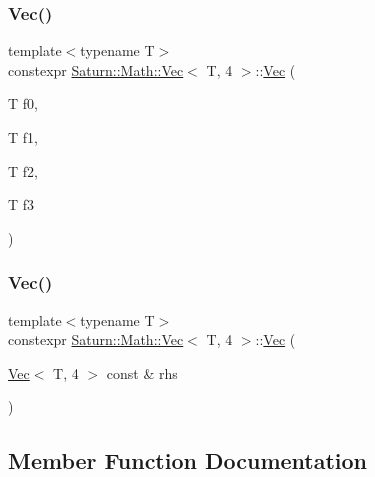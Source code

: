 \subsubsection{\texorpdfstring{Vec()}{Vec()}\hspace{0.1cm}{\footnotesize\ttfamily [3/4]}}
{\footnotesize\ttfamily template$<$typename T$>$ \\
constexpr \mbox{\hyperlink{class_saturn_1_1_math_1_1_vec}{Saturn\+::\+Math\+::\+Vec}}$<$ T, 4 $>$\+::\mbox{\hyperlink{class_saturn_1_1_math_1_1_vec}{Vec}} (\begin{DoxyParamCaption}\item[{T}]{f0,  }\item[{T}]{f1,  }\item[{T}]{f2,  }\item[{T}]{f3 }\end{DoxyParamCaption})\hspace{0.3cm}{\ttfamily [inline]}}

\mbox{\label{class_saturn_1_1_math_1_1_vec_3_01_t_00_014_01_4_a585f636b6e956baa35363174a4779b3f}} 
\subsubsection{\texorpdfstring{Vec()}{Vec()}\hspace{0.1cm}{\footnotesize\ttfamily [4/4]}}
{\footnotesize\ttfamily template$<$typename T$>$ \\
constexpr \mbox{\hyperlink{class_saturn_1_1_math_1_1_vec}{Saturn\+::\+Math\+::\+Vec}}$<$ T, 4 $>$\+::\mbox{\hyperlink{class_saturn_1_1_math_1_1_vec}{Vec}} (\begin{DoxyParamCaption}\item[{\mbox{\hyperlink{class_saturn_1_1_math_1_1_vec}{Vec}}$<$ T, 4 $>$ const \&}]{rhs }\end{DoxyParamCaption})\hspace{0.3cm}{\ttfamily [inline]}}



\subsection{Member Function Documentation}
\mbox{\label{class_saturn_1_1_math_1_1_vec_3_01_t_00_014_01_4_ad136f043bca7603c7132c755442ac9da}} 
